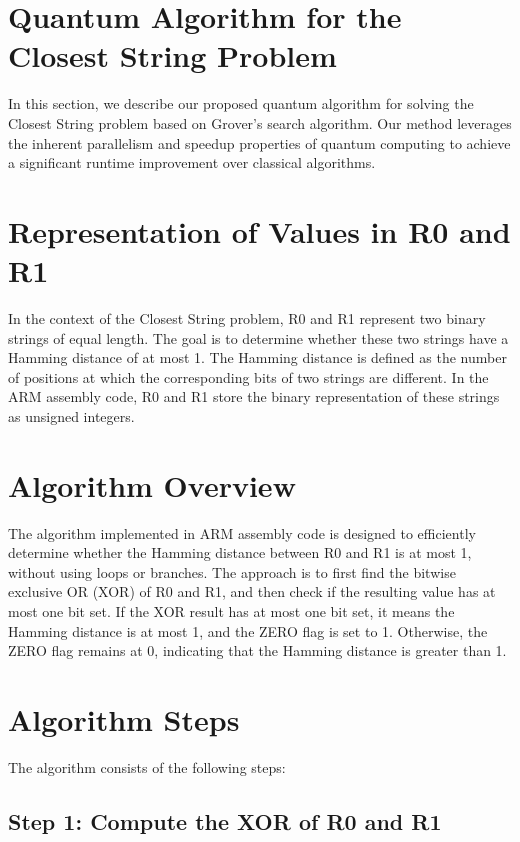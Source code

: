 \section{Quantum Algorithm for the Closest String Problem}
\label{sec:algorithm}

In this section, we describe our proposed quantum algorithm for solving the Closest String problem based on Grover's search algorithm. Our method leverages the inherent parallelism and speedup properties of quantum computing to achieve a significant runtime improvement over classical algorithms.

\section{Representation of Values in R0 and R1}

In the context of the Closest String problem, R0 and R1 represent two binary strings of equal length. The goal is to determine whether these two strings have a Hamming distance of at most 1. The Hamming distance is defined as the number of positions at which the corresponding bits of two strings are different. In the ARM assembly code, R0 and R1 store the binary representation of these strings as unsigned integers.

\section{Algorithm Overview}

The algorithm implemented in ARM assembly code is designed to efficiently determine whether the Hamming distance between R0 and R1 is at most 1, without using loops or branches. The approach is to first find the bitwise exclusive OR (XOR) of R0 and R1, and then check if the resulting value has at most one bit set. If the XOR result has at most one bit set, it means the Hamming distance is at most 1, and the ZERO flag is set to 1. Otherwise, the ZERO flag remains at 0, indicating that the Hamming distance is greater than 1.

\section{Algorithm Steps}

The algorithm consists of the following steps:

\subsection{Step 1: Compute the XOR of R0 and R1}

